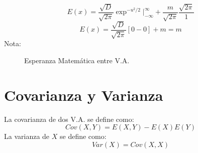 \documentclass[11pt,fleqn]{book} %
\numberwithin{equation}{section} %
\numberwithin{figure}{section} %
\numberwithin{table}{section} %
\begin{document}
$$E(x) = \frac{\sqrt{D}}{\sqrt{2 \pi}} \exp^{{-u^2}/{2}} \Big|^{\infty}_{-\infty} + \frac{m}{\sqrt{2 \pi}} \frac{\sqrt{2\pi}}{1} $$
$$E(x) = \frac{\sqrt{D}}{\sqrt{2 \pi}} [0-0] + m = m$$
\newpage
Nota:
\begin{figure}[!htbp]
 \centering
 \caption{Esperanza Matemática entre V.A.}
 \label{f:Esperanza Matemática entre V.A.}
\end{figure}
\section{Covarianza y Varianza}
La covarianza de dos V.A. se define como: 
$$Cov (X,Y) = E(X,Y)-E(X)E(Y)$$
La varianza de $X$ se define como:
$$Var (X) = Cov (X,X)$$
\end{document}
